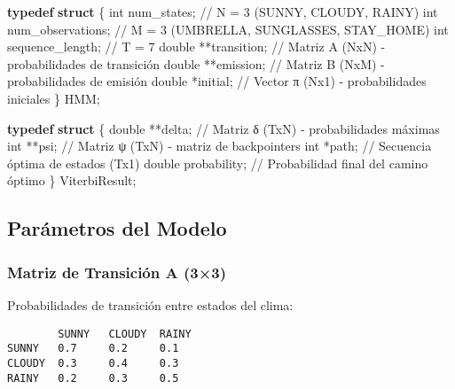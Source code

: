 \documentclass[
]{article}
\newenvironment{Shaded}{\begin{snugshade}}{\end{snugshade}}
\newcommand{\CommentTok}[1]{\textcolor[rgb]{0.37,0.37,0.37}{#1}}
\newcommand{\DataTypeTok}[1]{\textcolor[rgb]{0.68,0.00,0.00}{#1}}
\newcommand{\KeywordTok}[1]{\textcolor[rgb]{0.00,0.23,0.31}{\textbf{#1}}}
\newcommand{\NormalTok}[1]{\textcolor[rgb]{0.00,0.23,0.31}{#1}}
\newcommand{\OperatorTok}[1]{\textcolor[rgb]{0.37,0.37,0.37}{#1}}
\begin{document}
\begin{Shaded}
\begin{Highlighting}[]
\KeywordTok{typedef} \KeywordTok{struct} \OperatorTok{\{}
    \DataTypeTok{int}\NormalTok{ num\_states}\OperatorTok{;}       \CommentTok{// N = 3 (SUNNY, CLOUDY, RAINY)}
    \DataTypeTok{int}\NormalTok{ num\_observations}\OperatorTok{;} \CommentTok{// M = 3 (UMBRELLA, SUNGLASSES, STAY\_HOME)}
    \DataTypeTok{int}\NormalTok{ sequence\_length}\OperatorTok{;}  \CommentTok{// T = 7}
    \DataTypeTok{double} \OperatorTok{**}\NormalTok{transition}\OperatorTok{;}  \CommentTok{// Matriz A (NxN) {-} probabilidades de transición}
    \DataTypeTok{double} \OperatorTok{**}\NormalTok{emission}\OperatorTok{;}    \CommentTok{// Matriz B (NxM) {-} probabilidades de emisión}
    \DataTypeTok{double} \OperatorTok{*}\NormalTok{initial}\OperatorTok{;}      \CommentTok{// Vector π (Nx1) {-} probabilidades iniciales}
\OperatorTok{\}}\NormalTok{ HMM}\OperatorTok{;}

\KeywordTok{typedef} \KeywordTok{struct} \OperatorTok{\{}
    \DataTypeTok{double} \OperatorTok{**}\NormalTok{delta}\OperatorTok{;}       \CommentTok{// Matriz δ (TxN) {-} probabilidades máximas}
    \DataTypeTok{int} \OperatorTok{**}\NormalTok{psi}\OperatorTok{;}           \CommentTok{// Matriz ψ (TxN) {-} matriz de backpointers}
    \DataTypeTok{int} \OperatorTok{*}\NormalTok{path}\OperatorTok{;}           \CommentTok{// Secuencia óptima de estados (Tx1)}
    \DataTypeTok{double}\NormalTok{ probability}\OperatorTok{;}  \CommentTok{// Probabilidad final del camino óptimo}
\OperatorTok{\}}\NormalTok{ ViterbiResult}\OperatorTok{;}
\end{Highlighting}
\end{Shaded}

\subsection{Parámetros del Modelo}\label{paruxe1metros-del-modelo}

\subsubsection{Matriz de Transición A
(3×3)}\label{matriz-de-transiciuxf3n-a-33}

Probabilidades de transición entre estados del clima:

\begin{verbatim}
        SUNNY   CLOUDY  RAINY
SUNNY   0.7     0.2     0.1
CLOUDY  0.3     0.4     0.3
RAINY   0.2     0.3     0.5
\end{verbatim}
\end{document}
